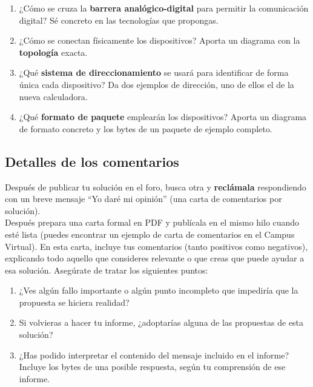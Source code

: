 \begin{enumerate}[itemsep=0.1cm]
\item ¿Cómo se cruza la \textbf{barrera analógico-digital} para permitir la comunicación digital? Sé concreto en las tecnologías que propongas.
\item ¿Cómo se conectan físicamente los dispositivos? Aporta un diagrama con la \textbf{topología} exacta.
\item ¿Qué \textbf{sistema de direccionamiento} se usará para identificar de forma única cada dispositivo? Da dos ejemplos de dirección, uno de ellos el de la nueva calculadora.
\item ¿Qué \textbf{formato de paquete} emplearán los dispositivos? Aporta un diagrama de formato concreto y los bytes de un paquete de ejemplo completo.
\end{enumerate}


\subsection*{Detalles de los comentarios}

Después de publicar tu solución en el foro, busca otra y \textbf{reclámala} respondiendo con un breve mensaje ``Yo daré mi opinión'' (una carta de comentarios por solución).\\

\noindent
Después prepara una carta formal en PDF y publícala en el mismo hilo cuando esté lista (puedes encontrar un ejemplo de carta de comentarios en el Campus Virtual). En esta carta, incluye tus comentarios (tanto positivos como negativos), explicando todo aquello que consideres relevante o que creas que puede ayudar a esa solución.  Asegúrate de tratar los siguientes puntos:

\begin{enumerate}[itemsep=0.1cm]
\item ¿Ves algún fallo importante o algún punto incompleto que impediría que la propuesta se hiciera realidad?
\item Si volvieras a hacer tu informe, ¿adoptarías alguna de las propuestas de esta solución?
\item ¿Has podido interpretar el contenido del mensaje incluido en el informe? Incluye los bytes de una posible respuesta, según tu comprensión de ese informe.
\end{enumerate}


